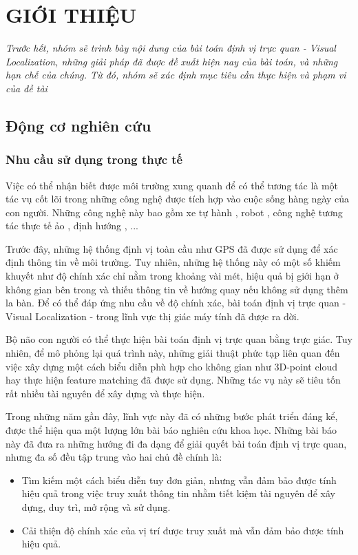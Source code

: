 \chapter{GIỚI THIỆU}

\textit{Trước hết, nhóm sẽ trình bày nội dung của bài toán định vị trực quan - Visual Localization, những giải pháp đã được đề xuất hiện nay của bài toán, và những hạn chế của chúng. Từ đó, nhóm sẽ xác định mục tiêu cần thực hiện và phạm vi của đề tài}

\section{Động cơ nghiên cứu}

\subsection{Nhu cầu sử dụng trong thực tế}

Việc có thể nhận biết được môi trường xung quanh để có thể tương tác là một tác vụ cốt lõi trong những công nghệ được tích hợp vào cuộc sống hàng ngày của con người. Những công nghệ này bao gồm xe tự hành \cite{chaabane2021end}, robot \cite{sunderhauf2015place}, công nghệ tương tác thực tế ảo \cite{middelberg2014scalable}, định hướng \cite{sarlin2023orienternet}, ... 

Trước đây, những hệ thống định vị toàn cầu như GPS đã được sử dụng để xác định thông tin về môi trường. Tuy nhiên, những hệ thống này có một số khiếm khuyết như độ chính xác chỉ nằm trong khoảng vài mét, hiệu quả bị giới hạn ở không gian bên trong và thiếu thông tin về hướng quay nếu không sử dụng thêm la bàn. Để có thể đáp ứng nhu cầu về độ chính xác, bài toán định vị trực quan - Visual Localization - trong lĩnh vực thị giác máy tính đã được ra đời.

Bộ não con người có thể thực hiện bài toán định vị trực quan bằng trực giác. Tuy nhiên, để mô phỏng lại quá trình này, những giải thuật phức tạp liên quan đến việc xây dựng một cách biểu diễn phù hợp cho không gian như 3D-point cloud hay thực hiện feature matching đã được sử dụng. Những tác vụ này sẽ tiêu tốn rất nhiều tài nguyên để xây dựng và thực hiện.

Trong những năm gần đây, lĩnh vực này đã có những bước phát triển đáng kể, được thể hiện qua một lượng lớn bài báo nghiên cứu khoa học. Những bài báo này đã đưa ra những hướng đi đa dạng để giải quyết bài toán định vị trực quan, nhưng đa số đều tập trung vào hai chủ đề chính là:
\begin{itemize}
    \item Tìm kiếm một cách biểu diễn tuy đơn giản, nhưng vẫn đảm bảo được tính hiệu quả trong việc truy xuất thông tin nhằm tiết kiệm tài nguyên để xây dựng, duy trì, mở rộng và sử dụng.
    \item Cải thiện độ chính xác của vị trí được truy xuất mà vẫn đảm bảo được tính hiệu quả.
\end{itemize}

